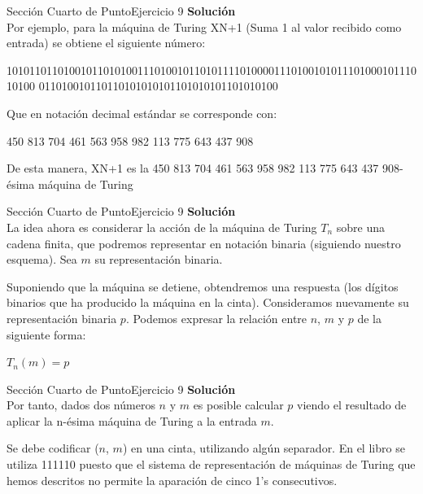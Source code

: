 \documentclass[10pt, envcountsect, presentation, aspectratio=169]{beamer}
\begin{document}
\begin{frame}{Sección Cuarto de Punto}{Ejercicio 9}
    \textbf{Solución}\\
    Por ejemplo, para la máquina de Turing XN+1 (Suma 1 al valor recibido como entrada) se obtiene el siguiente número:
    
    \begin{center}
10101101101001011010100111010010110101111010000111010010101110100010111010100
011010010110110101010101101010101101010100
    \end{center}
    Que en notación decimal estándar se corresponde con:
    \begin{center}
        450 813 704 461 563 958 982 113 775 643 437 908
    \end{center}

    De esta manera, XN+1 es la 450 813 704 461 563 958 982 113 775 643 437 908-ésima máquina de Turing
\end{frame}

\begin{frame}{Sección Cuarto de Punto}{Ejercicio 9}
    \textbf{Solución}\\
    La idea ahora es considerar la acción de la máquina de Turing $T_n$ sobre una cadena finita, que podremos representar en notación binaria (siguiendo nuestro esquema). Sea $m$ su representación binaria. 
    
    \vspace{2mm}
    Suponiendo que la máquina se detiene, obtendremos una respuesta (los dígitos binarios que ha producido la máquina en la cinta). Consideramos nuevamente su representación binaria $p$. 
    \vspace{2mm}
    Podemos expresar la relación entre $n$, $m$ y $p$ de la siguiente forma:
    \begin{center}
        $T_n(m) = p$
    \end{center}
\end{frame}

\begin{frame}{Sección Cuarto de Punto}{Ejercicio 9}
    \textbf{Solución}\\
    Por tanto, dados dos números $n$ y $m$ es posible calcular $p$ viendo el resultado de aplicar la n-ésima máquina de Turing a la entrada $m$.

    \vspace{2mm}
    Se debe codificar ($n$, $m$) en una cinta, utilizando algún separador. En el libro se utiliza 111110 puesto que el sistema de representación de máquinas de Turing que hemos descritos no permite la aparación de cinco 1's consecutivos.

\end{frame}
\end{document}
